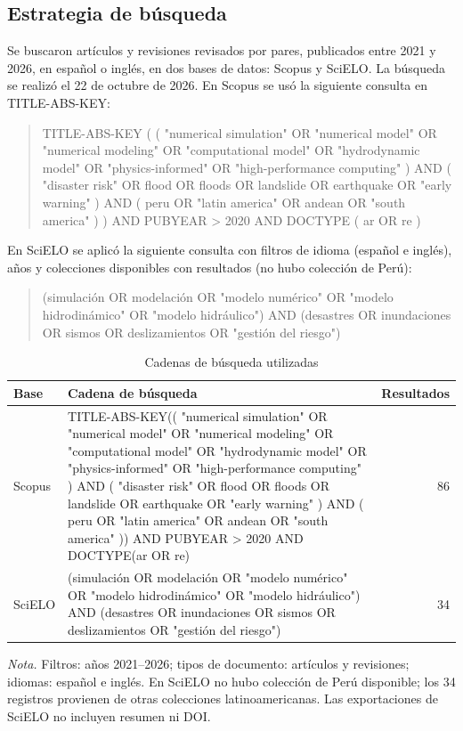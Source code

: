\documentclass[12pt,a4paper]{article}
\begin{document}
\subsection{Estrategia de búsqueda}
Se buscaron artículos y revisiones revisados por pares, publicados entre 2021 y 2026, en español o inglés, en dos bases de datos: Scopus y SciELO. La búsqueda se realizó el 22 de octubre de 2026. En Scopus se usó la siguiente consulta en TITLE-ABS-KEY:
\begin{quote}
\small
TITLE-ABS-KEY ( ( "numerical simulation" OR "numerical model" OR "numerical modeling" OR "computational model" OR "hydrodynamic model" OR "physics-informed" OR "high-performance computing" ) AND ( "disaster risk" OR flood OR floods OR landslide OR earthquake OR "early warning" ) AND ( peru OR "latin america" OR andean OR "south america" ) ) AND PUBYEAR > 2020 AND DOCTYPE ( ar OR re )
\end{quote}
En SciELO se aplicó la siguiente consulta con filtros de idioma (español e inglés), años y colecciones disponibles con resultados (no hubo colección de Perú):
\begin{quote}
\small
(simulación OR modelación OR "modelo numérico" OR "modelo hidrodinámico" OR "modelo hidráulico") AND (desastres OR inundaciones OR sismos OR deslizamientos OR "gestión del riesgo")
\end{quote}

\begin{table}[ht]
  \centering
  \caption{Cadenas de búsqueda utilizadas}
  \label{tab:queries}
  \begin{tabular}{@{}p{2.5cm}p{9cm}r@{}}
    \toprule
    Base & Cadena de búsqueda & Resultados \\
    \midrule
    Scopus & TITLE-ABS-KEY(( "numerical simulation" OR "numerical model" OR "numerical modeling" OR "computational model" OR "hydrodynamic model" OR "physics-informed" OR "high-performance computing" ) AND ( "disaster risk" OR flood OR floods OR landslide OR earthquake OR "early warning" ) AND ( peru OR "latin america" OR andean OR "south america" )) AND PUBYEAR > 2020 AND DOCTYPE(ar OR re) & 86 \\
    SciELO & (simulación OR modelación OR "modelo numérico" OR "modelo hidrodinámico" OR "modelo hidráulico") AND (desastres OR inundaciones OR sismos OR deslizamientos OR "gestión del riesgo") & 34 \\
    \bottomrule
  \end{tabular}
  \par\smallskip\noindent\small\textit{Nota.} Filtros: años 2021--2026; tipos de documento: artículos y revisiones; idiomas: español e inglés. En SciELO no hubo colección de Perú disponible; los 34 registros provienen de otras colecciones latinoamericanas. Las exportaciones de SciELO no incluyen resumen ni DOI.
\end{table}
\end{document}
